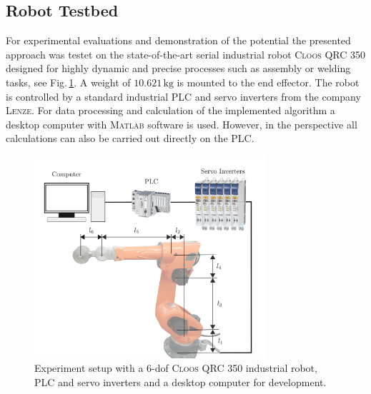 
\subsection{Robot Testbed}
\label{subsec:RobotTestbed}
For experimental evaluations and demonstration of the potential the presented approach was testet on the state-of-the-art serial industrial  robot \textsc{Cloos QRC 350} designed for highly dynamic and precise processes such as assembly or welding tasks, see Fig.\,\ref{fig:testbench}. 
A weight of $10.621\,\mathrm{kg}$ is mounted to the end effector.
The robot is controlled by a standard industrial PLC and servo inverters from the company \textsc{Lenze}. 
For data processing and calculation of the implemented algorithm a desktop computer with \textsc{Matlab} software is used. 
However, in the perspective all calculations can also be carried out directly on the PLC. 

\begin{figure}[!ht]             %
    \centering                  %
    \def\svgwidth{\textwidth/2}    
    \includegraphics[width=8.6cm]{Chapters/Experiments/Robot_Testbed/Cloos_cover} 
    \vspace{-0.2cm}
    \caption{Experiment setup with a 6-dof \textsc{Cloos QRC 350} industrial robot, PLC and servo inverters and a desktop computer for development.}
    \vspace{-0.2cm}
   \label{fig:testbench}
\end{figure}


